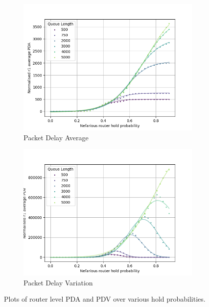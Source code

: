   \begin{figure}
      \centering
      \begin{subfigure}{0.475\textwidth}
          \includegraphics[width=\textwidth]{figs/results/qlen_fitting/qlen_PDA_lm.png}
          \caption{Packet Delay Average}
      \end{subfigure}
      \begin{subfigure}{0.475\textwidth}
          \includegraphics[width=\textwidth]{figs/results/qlen_fitting/qlen_PDV_lm.png}
          \caption{Packet Delay Variation}
      \end{subfigure}
      \caption{Plots of router level PDA and PDV over various hold probabilities.}
      \label{fig:RvariedqlenPDM}
  \end{figure}
